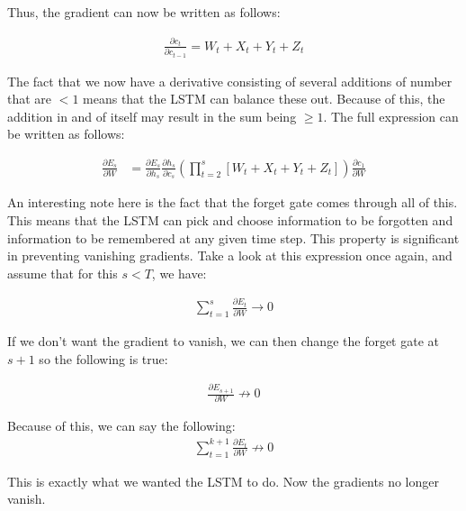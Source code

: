 \noindent
Thus, the gradient can now be written as follows:

\begin{align}
    \frac{\partial c_t}{\partial c_{t-1}} = W_t + X_t + Y_t + Z_t
\end{align}

\noindent
The fact that we now have a derivative consisting of several additions of number that are $<1$ means that the LSTM can balance these out. Because of this, the addition in and of itself may result in the sum being $\geq 1$. The full expression can be written as follows:


\begin{align}
    \frac{\partial E_s}{\partial W} &= \frac{\partial E_s}{\partial h_s}\frac{\partial h_s}{\partial c_s} \left(\prod_{t=2}^s \left[W_t + X_t + Y_t + Z_t \right] \right) \frac{\partial c_1} {\partial W}
\end{align}

\noindent
An interesting note here is the fact that the forget gate comes through all of this. This means that the LSTM can pick and choose information to be forgotten and information to be remembered at any given time step. This property is significant in preventing vanishing gradients. Take a look at this expression once again, and assume that for this $s < T$, we have:

\begin{align}
    \sum_{t=1}^s \frac{\partial E_t}{\partial W} \rightarrow 0
\end{align}

\noindent
If we don't want the gradient to vanish, we can then change the forget gate at $s+1$ so the following is true:

\begin{align}
    \frac{\partial E_{s+1}}{\partial W} \not \rightarrow 0
\end{align}

\noindent
Because of this, we can say the following:
\begin{align}
    \sum_{t=1}^{k+1} \frac{\partial E_t}{\partial W} \not \rightarrow 0
\end{align}

\noindent
This is exactly what we wanted the LSTM to do. Now the gradients no longer vanish.
